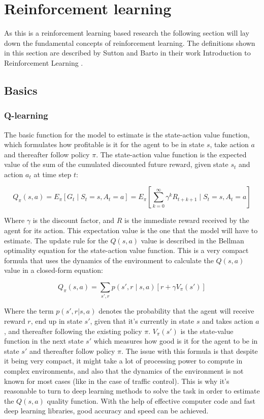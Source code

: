 \documentclass[
]{elteikthesis}[2023/04/10]
\begin{document}
\section{Reinforcement learning}

As this is a reinforcement learning based research the following
section will lay down the fundamental concepts of reinforcement learning.
The definitions shown in this section are described by Sutton and
Barto in their work Introduction to Reinforcement Learning \cite{Sutton2018}.

\subsection{Basics}

\subsubsection*{Q-learning}

The basic function for the model to estimate is the state-action value
function, which formulates how profitable is it for the
agent to be in state $s$, take action $a$ and thereafter follow
policy $\pi$. The state-action value function is the expected value
of the sum of the cumulated discounted future reward, given state
$s_{t}$ and action $a_{t}$ at time step $t$:

\begin{equation}
Q_{\pi}(s,a)=E_{\pi}\left[G_{t}\mid S_{t}=s,A_{t}=a\right]=E_{\pi}\left[\sum_{k=0}^{\infty}\gamma^{k}R_{t+k+1}\mid S_{t}=s,A_{t}=a\right]
\end{equation}

Where $\gamma$ is the discount factor, and $R$ is the immediate
reward received by the agent for its action. This expectation value
is the one that the model will have to estimate. The update rule for
the $Q(s,a)$ value is described in the Bellman optimality equation
for the state-action value function. This is a very compact formula
that uses the dynamics of the environment to calculate the $Q(s,a)$
value in a closed-form equation:

\begin{equation}
Q_{\pi}(s,a)=\sum_{s',r}p(s\prime,r\mid s,a)\left[r+\gamma V_{\pi}(s\prime)\right]
\end{equation}

Where the term $p(s\prime,r|s,a)$ denotes the probability that the
agent will receive reward $r$, end up in state $s\prime$, given
that it's currently in state $s$ and takes action $a$, and thereafter
following the existing policy $\pi$. $V_{\pi}(s\prime)$ is the
state-value function in the next state $s\prime$ which measures
how good is it for the agent to be in state $s\prime$ and thereafter follow
policy $\pi$. The issue with this formula is that despite it being
very compact, it might take a lot of processing power to compute in
complex environments, and also that the dynamics of the environment
is not known for most cases (like in the case of traffic control).
This is why it's reasonable to turn to deep learning methods to solve
the task in order to estimate the $Q(s,a)$ quality function. With the
help of effective computer code and fast deep learning libraries,
good accuracy and speed can be achieved.
\end{document}
